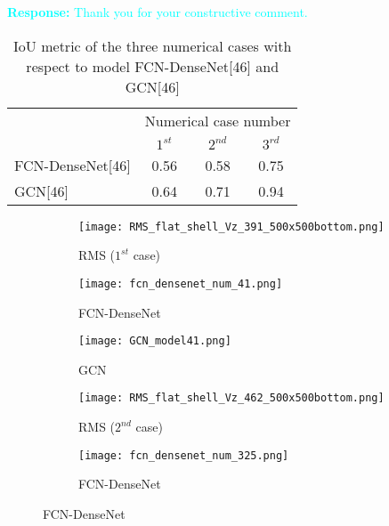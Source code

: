 \documentclass[11pt,a2paper]{report}
\begin{document}
\begin{enumerate}
\textcolor{Cyan}
{
	\textbf{Response:}
	Thank you for your constructive comment.\\
	\begin{table}[ht!]
		\centering
		\begin{tabular}{lccc}
			\toprule
			& \multicolumn{3}{l}{Numerical case number} \\
			& \(1^{st}\) & \(2^{nd}\) & \(3^{rd}\) \\ 
			\midrule
			FCN-DenseNet[46] & 0.56 & 0.58 & 0.75 \\
			GCN[46]          & 0.64 & 0.71 & 0.94 \\ 
			\bottomrule
		\end{tabular}
	\caption{IoU metric of the three numerical cases with respect to model FCN-DenseNet[46] and GCN[46]}
	\end{table}
}
	\begin{figure}[ht!]
		\centering
		\begin{subfigure}[b]{0.32\textwidth}
			\centering
			\texttt{[image: RMS\_flat\_shell\_Vz\_391\_500x500bottom.png]}
			\caption{RMS (\(1^{st}\) case)}
			\label{fig:num_GT_391}
		\end{subfigure}
		\hfill
		\begin{subfigure}[b]{0.32\textwidth}
			\centering
			\texttt{[image: fcn\_densenet\_num\_41.png]}
			\caption{FCN-DenseNet}
			\label{fig:Convlstm_binary_RMS_391}
		\end{subfigure}
		\hfill
		\begin{subfigure}[b]{0.32\textwidth}
			\centering
			\texttt{[image: GCN\_model41.png]}
			\caption{GCN}
			\label{fig:AE_binary_RMS_391}
		\end{subfigure}
		\par\medskip
		\begin{subfigure}[b]{0.32\textwidth}
			\centering
			\texttt{[image: RMS\_flat\_shell\_Vz\_462\_500x500bottom.png]}
			\caption{RMS (\(2^{nd}\) case)}
			\label{fig:num_GT_462}
		\end{subfigure}
		\hfill
		\begin{subfigure}[b]{0.32\textwidth}
			\centering
			\texttt{[image: fcn\_densenet\_num\_325.png]}
			\caption{FCN-DenseNet}
			\label{fig:Convlstm_binary_RMS_462}
		\end{subfigure}

\end{figure}
\end{enumerate}
\end{document}
